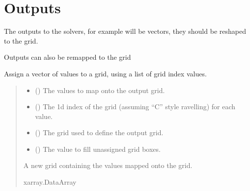 \documentclass[letterpaper,10pt,english]{sphinxmanual}
\begin{document}
\section{Outputs}
\label{\detokenize{kriging:outputs}}
\sphinxAtStartPar
The outputs to the solvers,  for example will be
vectors, they should be re\sphinxhyphen{}shaped to the grid.

\sphinxAtStartPar
Outputs can also be re\sphinxhyphen{}mapped to the grid

\begin{fulllineitems}
\label{\detokenize{kriging:glomar_gridding.grid.assign_to_grid}}
\pysigstartsignatures
\pysiglinewithargsret
{}
{\sphinxparamcomma {}\sphinxparamcomma {}\sphinxparamcomma {}}
{}
\pysigstopsignatures
\sphinxAtStartPar
Assign a vector of values to a grid, using a list of grid index values.
\begin{quote}\begin{description}
\begin{itemize}
\item {}
\sphinxAtStartPar
{} () \textendash{} The values to map onto the output grid.

\item {}
\sphinxAtStartPar
{} () \textendash{} The 1d index of the grid (assuming “C” style ravelling) for each value.

\item {}
\sphinxAtStartPar
{} () \textendash{} The grid used to define the output grid.

\item {}
\sphinxAtStartPar
{} () \textendash{} The value to fill unassigned grid boxes.

\end{itemize}

\sphinxAtStartPar
{} \textendash{} A new grid containing the values mapped onto the grid.

\sphinxAtStartPar
xarray.DataArray

\end{description}\end{quote}

\end{fulllineitems}
\end{document}
